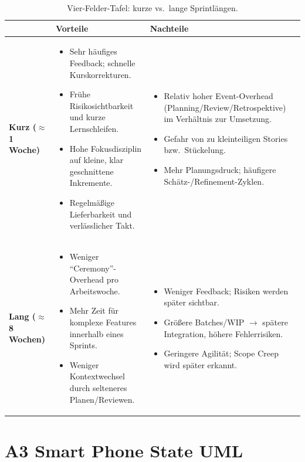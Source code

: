 \documentclass[12pt]{article}
\begin{document}
\begin{table}[h]
\centering
\renewcommand{\arraystretch}{1.15}
\begin{tabularx}{\textwidth}{@{} l Y Y @{}}
\toprule
& \textbf{Vorteile} & \textbf{Nachteile} \\
\midrule
\textbf{Kurz (\(\approx\) 1 Woche)} &
\begin{itemize}[leftmargin=*]
  \item Sehr häufiges Feedback; schnelle Kurskorrekturen.
  \item Frühe Risikosichtbarkeit und kurze Lernschleifen.
  \item Hohe Fokusdisziplin auf kleine, klar geschnittene Inkremente.
  \item Regelmäßige Lieferbarkeit und verlässlicher Takt.
\end{itemize}
&
\begin{itemize}[leftmargin=*]
  \item Relativ hoher Event-Overhead (Planning/Review/Retrospektive) im Verhältnis zur Umsetzung.
  \item Gefahr von zu kleinteiligen Stories bzw.\ Stückelung.
  \item Mehr Planungsdruck; häufigere Schätz-/Refinement-Zyklen.
\end{itemize}
\\
\midrule
\textbf{Lang (\(\approx\) 8 Wochen)} &
\begin{itemize}[leftmargin=*]
  \item Weniger \enquote{Ceremony}-Overhead pro Arbeitswoche.
  \item Mehr Zeit für komplexe Features innerhalb eines Sprints.
  \item Weniger Kontextwechsel durch selteneres Planen/Reviewen.
\end{itemize}
&
\begin{itemize}[leftmargin=*]
  \item Weniger Feedback; Risiken werden später sichtbar.
  \item Größere Batches/WIP $\rightarrow$ spätere Integration, höhere Fehlerrisiken.
  \item Geringere Agilität; Scope Creep wird später erkannt.
\end{itemize}
\\
\bottomrule
\end{tabularx}
\caption{Vier-Felder-Tafel: kurze vs.\ lange Sprintlängen.}
\end{table}

\section*{A3 Smart Phone State UML}
 
\end{document}
